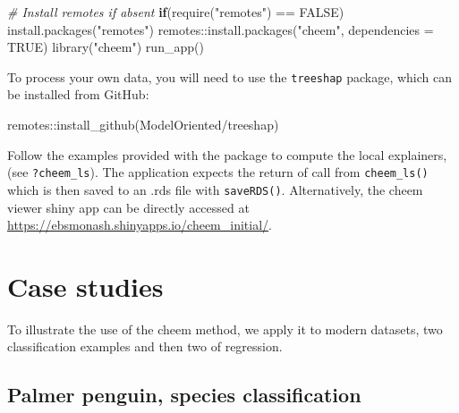 \documentclass[
]{article}
\newenvironment{Shaded}{\begin{snugshade}}{\end{snugshade}}
\newcommand{\AttributeTok}[1]{\textcolor[rgb]{0.77,0.63,0.00}{#1}}
\newcommand{\CommentTok}[1]{\textcolor[rgb]{0.56,0.35,0.01}{\textit{#1}}}
\newcommand{\ConstantTok}[1]{\textcolor[rgb]{0.00,0.00,0.00}{#1}}
\newcommand{\ControlFlowTok}[1]{\textcolor[rgb]{0.13,0.29,0.53}{\textbf{#1}}}
\newcommand{\FunctionTok}[1]{\textcolor[rgb]{0.00,0.00,0.00}{#1}}
\newcommand{\NormalTok}[1]{#1}
\newcommand{\SpecialCharTok}[1]{\textcolor[rgb]{0.00,0.00,0.00}{#1}}
\newcommand{\StringTok}[1]{\textcolor[rgb]{0.31,0.60,0.02}{#1}}
\begin{document}
\begin{Shaded}
\begin{Highlighting}[]
\CommentTok{\# Install remotes if absent}
\ControlFlowTok{if}\NormalTok{(}\FunctionTok{require}\NormalTok{(}\StringTok{"remotes"}\NormalTok{) }\SpecialCharTok{==} \ConstantTok{FALSE}\NormalTok{) }\FunctionTok{install.packages}\NormalTok{(}\StringTok{"remotes"}\NormalTok{)}
\NormalTok{remotes}\SpecialCharTok{::}\FunctionTok{install.packages}\NormalTok{(}\StringTok{"cheem"}\NormalTok{, }\AttributeTok{dependencies =} \ConstantTok{TRUE}\NormalTok{)}
\FunctionTok{library}\NormalTok{(}\StringTok{"cheem"}\NormalTok{)}
\FunctionTok{run\_app}\NormalTok{()}
\end{Highlighting}
\end{Shaded}

To process your own data, you will need to use the \texttt{treeshap} package, which can be installed from GitHub:

\begin{Shaded}
\begin{Highlighting}[]
\NormalTok{remotes}\SpecialCharTok{::}\FunctionTok{install\_github}\NormalTok{(}\StringTok{\textquotesingle{}ModelOriented/treeshap\textquotesingle{}}\NormalTok{)}
\end{Highlighting}
\end{Shaded}

Follow the examples provided with the package to compute the local explainers, (see \texttt{?cheem\_ls}). The application expects the return of call from \texttt{cheem\_ls()} which is then saved to an .rds file with \texttt{saveRDS()}. Alternatively, the cheem viewer shiny app can be directly accessed at \url{https://ebsmonash.shinyapps.io/cheem_initial/}.

\hypertarget{sec:casestudies}{%
\section{Case studies}\label{sec:casestudies}}

To illustrate the use of the cheem method, we apply it to modern datasets, two classification examples and then two of regression.

\hypertarget{palmer-penguin-species-classification}{%
\subsection{Palmer penguin, species classification}\label{palmer-penguin-species-classification}}
\end{document}
